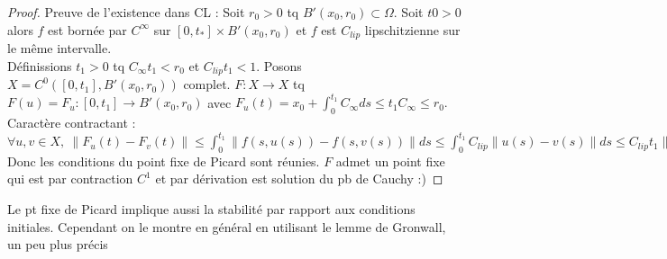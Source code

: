 \begin{proof}
    Preuve de l'existence dans CL : Soit $r_0>0$ tq $B'(x_0,r_0)\subset \Omega$. Soit $t0>0$ alors $f$ est bornée par $C^\infty $ sur $[0,t_*]\times B'(x_0,r_0)$ et $f$ est $C_{lip}$ lipschitzienne sur le même intervalle.\\
    Définissions $t_1>0$ tq $C_\infty t_1<r_0$ et $C_{lip}t_1<1$. Posons $X=C^0([0,t_1],B'(x_0,r_0))$ complet. $F:X\to X$ tq $F(u)=F_u:[0,t_1]\to B'(x_0,r_0)$ avec $F_u(t)=x_0+\int_0^{t_1}C_\infty ds\le t_1C_\infty \le r_0.$ \\
    Caractère contractant : $\forall u,v\in X,\ \|F_u(t)-F_v(t)\|\le \int_0^{t_1} \|f(s,u(s))-f(s,v(s))\|ds\le \int_0^{t_1}C_{lip}\|u(s)-v(s)\|ds\le C_{lip}t_1\|u-v\|_\infty .$ Donc les conditions du point fixe de Picard sont réunies. $F$ admet un point fixe qui est par contraction $C^1$ et par dérivation est solution du pb de Cauchy :)
\end{proof}
\begin{remarque}
    Le pt fixe de Picard implique aussi la stabilité par rapport aux conditions initiales. Cependant on le montre en général en utilisant le lemme de Gronwall, un peu plus précis
\end{remarque}

